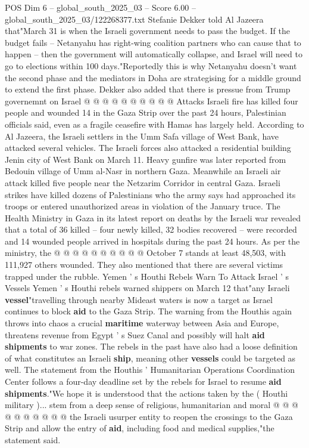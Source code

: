 \begin{textsample}{POS Dim 6 – global\_south\_2025\_03 – Score 6.00 – global\_south\_2025\_03/122268377.txt}
Stefanie Dekker told Al Jazeera that"March 31 is when the Israeli government needs to pass the budget.
If the budget fails -- Netanyahu has right-wing coalition partners who can cause that to happen -- then the government will automatically collapse, and Israel will need to go to elections within 100 days."Reportedly this is why Netanyahu doesn't want the second phase and the mediators in Doha are strategising for a middle ground to extend the first phase.
Dekker also added that there is pressue from Trump governemnt on Israel @ @ @ @ @ @ @ @ @ @ Attacks Israeli fire has killed four people and wounded 14 in the Gaza Strip over the past 24 hours, Palestinian officials said, even as a fragile ceasefire with Hamas has largely held.
According to Al Jazeera, the Israeli settlers in the Umm Safa village of West Bank, have attacked several vehicles.
The Israeli forces also attacked a residential building Jenin city of West Bank on March 11.
Heavy gunfire was later reported from Bedouin village of Umm al-Nasr in northern Gaza.
Meanwhile an Israeli air attack killed five people near the Netzarim Corridor in central Gaza.
Israeli strikes have killed dozens of Palestinians who the army says had approached its troops or entered unauthorized areas in violation of the January truce.
The Health Ministry in Gaza in its latest report on deaths by the Israeli war revealed that a total of 36 killed -- four newly killed, 32 bodies recovered -- were recorded and 14 wounded people arrived in hospitals during the past 24 hours.
As per the ministry, the @ @ @ @ @ @ @ @ @ @ October 7 stands at least 48,503, with 111,927 others wounded.
They also mentioned that there are several victims trapped under the rubble.
Yemen ' s Houthi Rebels Warn To Attack Israel ' s Vessels Yemen ' s Houthi rebels warned shippers on March 12 that"any Israeli \textbf{vessel}"travelling through nearby Mideast waters is now a target as Israel continues to block \textbf{aid} to the Gaza Strip.
The warning from the Houthis again throws into chaos a crucial \textbf{maritime} waterway between Asia and Europe, threatens revenue from Egypt ' s Suez Canal and possibly will halt \textbf{aid} \textbf{shipments} to war zones.
The rebels in the past have also had a loose definition of what constitutes an Israeli \textbf{ship}, meaning other \textbf{vessels} could be targeted as well.
The statement from the Houthis ' Humanitarian Operations Coordination Center follows a four-day deadline set by the rebels for Israel to resume \textbf{aid} \textbf{shipments}."We hope it is understood that the actions taken by the ( Houthi military )... stem from a deep sense of religious, humanitarian and moral @ @ @ @ @ @ @ @ @ @ the Israeli usurper entity to reopen the crossings to the Gaza Strip and allow the entry of \textbf{aid}, including food and medical supplies,"the statement said.

\end{textsample}
